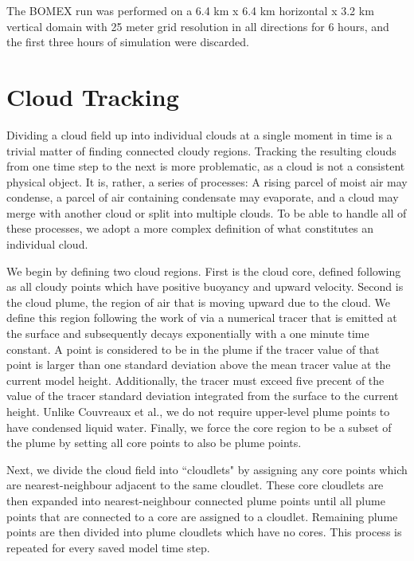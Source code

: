 \documentclass[acp]{copernicus}
\begin{document}
The BOMEX run was performed on a 6.4 km x 6.4 km horizontal x 3.2 km vertical 
domain with 25 meter grid resolution in all directions for 6 hours, and the 
first three hours of simulation were discarded. 




\section{Cloud Tracking}

Dividing a cloud field up into individual clouds at a single moment in time is 
a trivial matter of finding connected cloudy regions.  Tracking the resulting 
clouds from one time step to the next is more problematic, as a cloud is not a 
consistent physical object.  It is, rather, a series of processes: A rising 
parcel of moist air may condense, a parcel of air containing condensate may 
evaporate, and a cloud may merge with another cloud or split into multiple 
clouds.  To be able to handle all of these processes, we adopt a more complex 
definition of what constitutes an individual cloud.

We begin by defining two cloud regions.  First is the cloud core, defined 
following \cite{Siebesma1995} as all cloudy points which have positive 
buoyancy and upward velocity.  Second is the cloud plume, the region of air 
that is moving upward due to the cloud.  We define this region following the 
work of \cite{Couvreaux2010} via a numerical tracer that is emitted at the 
surface and subsequently decays exponentially with a one minute time constant.  
A point is considered to be in the plume if the tracer value of that point is 
larger than one standard deviation above the mean tracer value at the current 
model height.  Additionally, the tracer must exceed five precent of the value 
of the tracer standard deviation integrated from the surface to the current 
height.  Unlike Couvreaux et al., we do not require upper-level plume points 
to have condensed liquid water.  Finally, we force the core region to be a 
subset of the plume by setting all core points to also be plume points.

Next, we divide the cloud field into ``cloudlets" by assigning any core points 
which are nearest-neighbour adjacent to the same cloudlet.  These core 
cloudlets are then expanded into nearest-neighbour connected plume points 
until all plume points that are connected to a core are assigned to a 
cloudlet.  Remaining plume points are then divided into plume cloudlets which 
have no cores.  This process is repeated for every saved model time step.
\end{document}
